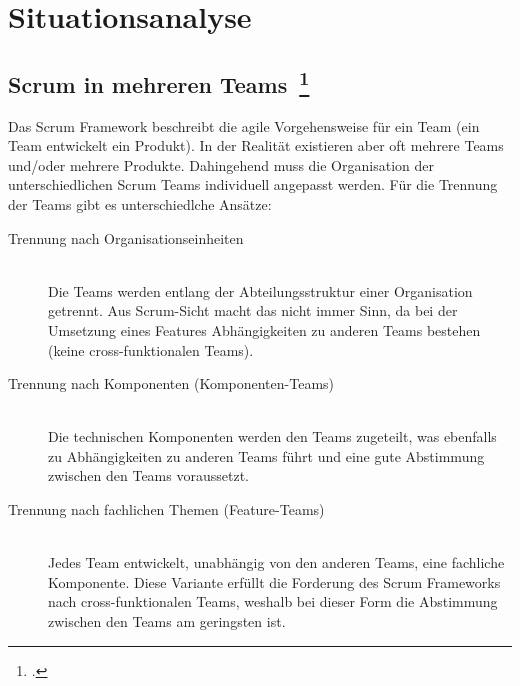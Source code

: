 \chapter{Situationsanalyse}

\section[Scrum in mehreren Teams]{Scrum in mehreren Teams~\footcite[vgl.][S.172ff]{scrum_kurz_gut_2013}}

Das Scrum Framework beschreibt die agile Vorgehensweise für ein Team (ein Team entwickelt ein Produkt).
In der Realität existieren aber oft mehrere Teams und/oder mehrere Produkte. 
Dahingehend muss die Organisation der unterschiedlichen Scrum Teams individuell angepasst werden.
Für die Trennung der Teams gibt es unterschiedlche Ansätze:
\begin{description}
  \item[Trennung nach Organisationseinheiten] \hfill \\ Die Teams werden entlang der Abteilungsstruktur einer Organisation getrennt. Aus Scrum-Sicht macht das nicht immer Sinn, da bei der Umsetzung eines Features Abhängigkeiten zu anderen Teams bestehen (keine cross-funktionalen Teams).
  \item[Trennung nach Komponenten (Komponenten-Teams)] \hfill \\ Die technischen Komponenten werden den Teams zugeteilt, was ebenfalls zu Abhängigkeiten zu anderen Teams führt und eine gute Abstimmung zwischen den Teams voraussetzt.
  \item[Trennung nach fachlichen Themen (Feature-Teams)] \hfill \\ Jedes Team entwickelt, unabhängig von den anderen Teams, eine fachliche Komponente. Diese Variante erfüllt die Forderung des Scrum Frameworks nach cross-funktionalen Teams, weshalb bei dieser Form die Abstimmung zwischen den Teams am geringsten ist.
\end{description}

